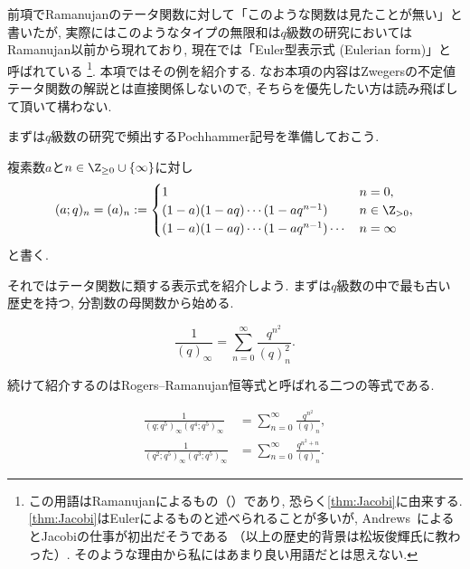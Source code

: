 \documentclass[11pt,b5paper,oneside,lualatex]{ltjsarticle} %
\numberwithin{equation}{section} %
\begin{document}

前項でRamanujanのテータ関数に対して「このような関数は見たことが無い」と書いたが, 実際にはこのようなタイプの無限和は$ q $級数の研究においてはRamanujan以前から現れており, 現在では「Euler型表示式 (Eulerian form)」と呼ばれている
\footnote{この用語はRamanujanによるもの（\cite[119ページ]{魅惑}）であり, 恐らく\cref{thm:Jacobi}に由来する. 
	\cref{thm:Jacobi}はEulerによるものと述べられることが多いが, Andrews~\cite{Andrews_combi}によるとJacobiの仕事が初出だそうである
	（以上の歴史的背景は松坂俊輝氏に教わった）. 
	そのような理由から私にはあまり良い用語だとは思えない. }. 
本項ではその例を紹介する. 
なお本項の内容はZwegersの不定値テータ関数の解説とは直接関係しないので, そちらを優先したい方は読み飛ばして頂いて構わない. 

まずは$ q $級数の研究で頻出するPochhammer記号を準備しておこう. 

\begin{dfn}[Pochhammer記号]
	複素数$ a $と$ n \in \Z_{\ge 0} \cup \{ \infty \} $に対し
	\[
	(a; q)_n = (a)_n :=
	\begin{cases}
		1 & n=0, \\
		(1 - a) (1 - aq) \cdots (1 - aq^{n-1}) & n \in \Z_{>0}, \\
		(1 - a) (1 - aq) \cdots (1 - aq^{n-1}) \cdots & n = \infty
	\end{cases}
	\]
	と書く. 
\end{dfn}

それではテータ関数に類する表示式を紹介しよう. 
まずは$ q $級数の中で最も古い歴史を持つ, 分割数の母関数から始める. 

\begin{thm}
	\label{thm:Jacobi}
	\[
	\frac{1}{(q)_\infty} = \sum_{n=0}^{\infty} \frac{q^{n^2}}{(q)_n^2}.
	\]
\end{thm}

続けて紹介するのはRogers--Ramanujan恒等式と呼ばれる二つの等式である. 

\begin{thm}
	\begin{align}
		\frac{1}{(q; q^5)_\infty (q^4; q^5)_\infty} 
		&=
		\sum_{n=0}^{\infty} \frac{q^{n^2}}{(q)_n},
		\\
		\frac{1}{(q^2; q^5)_\infty (q^3; q^5)_\infty} 
		&=
		\sum_{n=0}^{\infty} \frac{q^{n^2 + n}}{(q)_n}.
	\end{align}
\end{thm}
\end{document}
